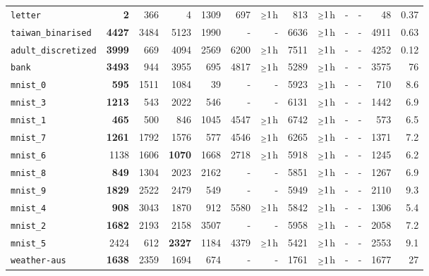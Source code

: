 \begin{tabular}{lrrrrrrrrrrrr}
\texttt{letter} & \textbf{2} & 366 & 4 & 1309 & 697 & $\mathsmaller{\geq}1$h & 813 & $\mathsmaller{\geq}1$h & - & - & 48 & 0.37\\
\texttt{taiwan\_binarised} & \textbf{4427} & 3484 & 5123 & 1990 & - & - & 6636 & $\mathsmaller{\geq}1$h & - & - & 4911 & 0.63\\
\texttt{adult\_discretized} & \textbf{3999} & 669 & 4094 & 2569 & 6200 & $\mathsmaller{\geq}1$h & 7511 & $\mathsmaller{\geq}1$h & - & - & 4252 & 0.12\\
\texttt{bank} & \textbf{3493} & 944 & 3955 & 695 & 4817 & $\mathsmaller{\geq}1$h & 5289 & $\mathsmaller{\geq}1$h & - & - & 3575 & 76\\
\texttt{mnist\_0} & \textbf{595} & 1511 & 1084 & 39 & - & - & 5923 & $\mathsmaller{\geq}1$h & - & - & 710 & 8.6\\
\texttt{mnist\_3} & \textbf{1213} & 543 & 2022 & 546 & - & - & 6131 & $\mathsmaller{\geq}1$h & - & - & 1442 & 6.9\\
\texttt{mnist\_1} & \textbf{465} & 500 & 846 & 1045 & 4547 & $\mathsmaller{\geq}1$h & 6742 & $\mathsmaller{\geq}1$h & - & - & 573 & 6.5\\
\texttt{mnist\_7} & \textbf{1261} & 1792 & 1576 & 577 & 4546 & $\mathsmaller{\geq}1$h & 6265 & $\mathsmaller{\geq}1$h & - & - & 1371 & 7.2\\
\texttt{mnist\_6} & 1138 & 1606 & \textbf{1070} & 1668 & 2718 & $\mathsmaller{\geq}1$h & 5918 & $\mathsmaller{\geq}1$h & - & - & 1245 & 6.2\\
\texttt{mnist\_8} & \textbf{849} & 1304 & 2023 & 2162 & - & - & 5851 & $\mathsmaller{\geq}1$h & - & - & 1267 & 6.9\\
\texttt{mnist\_9} & \textbf{1829} & 2522 & 2479 & 549 & - & - & 5949 & $\mathsmaller{\geq}1$h & - & - & 2110 & 9.3\\
\texttt{mnist\_4} & \textbf{908} & 3043 & 1870 & 912 & 5580 & $\mathsmaller{\geq}1$h & 5842 & $\mathsmaller{\geq}1$h & - & - & 1306 & 5.4\\
\texttt{mnist\_2} & \textbf{1682} & 2193 & 2158 & 3507 & - & - & 5958 & $\mathsmaller{\geq}1$h & - & - & 2058 & 7.2\\
\texttt{mnist\_5} & 2424 & 612 & \textbf{2327} & 1184 & 4379 & $\mathsmaller{\geq}1$h & 5421 & $\mathsmaller{\geq}1$h & - & - & 2553 & 9.1\\
\texttt{weather-aus} & \textbf{1638} & 2359 & 1694 & 674 & - & - & 1761 & $\mathsmaller{\geq}1$h & - & - & 1677 & 27\\
\bottomrule
\end{tabular}
